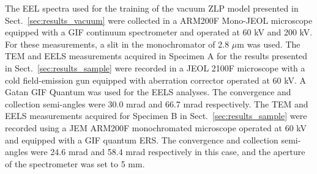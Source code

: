 {\justify
The EEL spectra used for the training of the vacuum ZLP model presented in Sect.~\ref{sec:results_vacuum} were collected in a ARM200F Mono-JEOL microscope equipped with a GIF continuum spectrometer and operated at 60 kV and 200 kV. For these measurements, a slit in the monochromator of 2.8 $\mu$m was used.
%
The TEM and EELS measurements acquired in Specimen A for the results presented in
Sect.~\ref{sec:results_sample} were recorded in a JEOL 2100F microscope with a cold field-emission
gun equipped with aberration corrector operated at 60 kV. A Gatan GIF Quantum was used for
the EELS analyses. The convergence and collection semi-angles were 30.0 mrad and 66.7 mrad respectively.
%
The TEM and EELS measurements acquired for Specimen B in Sect.~\ref{sec:results_sample}
were recorded using a JEM ARM200F monochromated microscope operated at 60 kV and equipped with
a GIF quantum ERS. The convergence and collection semi-angles were 24.6 mrad and 58.4 mrad respectively
in this case, and the aperture of the spectrometer was set to 5 mm.}

